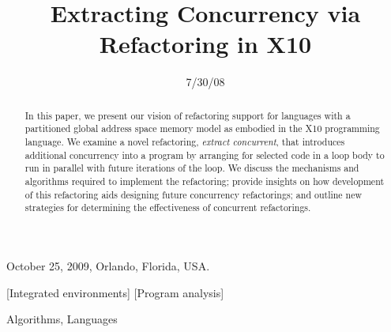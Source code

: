 \documentclass[natbib]{sigplanconf}
\begin{document}
 {October 25, 2009, Orlando, Florida, USA.}
\title{Extracting Concurrency via Refactoring in X10}

 



\date{7/30/08}

\maketitle

\begin{abstract}
In this paper, we present our vision of refactoring 
support for languages with a partitioned global address space memory model as 
embodied in the X10 programming language. We examine a novel refactoring, 
\emph{extract concurrent}, that introduces additional concurrency 
into a program by arranging for selected code in a loop body to run in parallel
with future iterations of the loop. We discuss the mechanisms and algorithms required
to implement the refactoring; provide insights on how development of this
refactoring aids designing future concurrency refactorings; and outline new
strategies for determining the effectiveness of concurrent refactorings.
\end{abstract}

[Integrated
environments]
[Program analysis]

\terms
Algorithms, Languages







\end{document}
